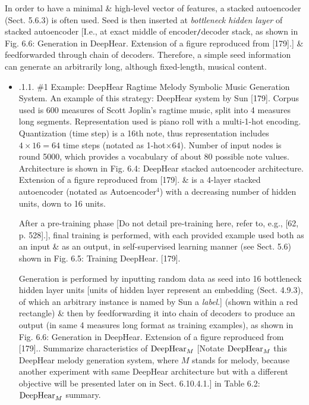 \documentclass{article}
\begin{document}
\begin{itemize}
\begin{itemize}
\begin{itemize}
			In order to have a minimal \& high-level vector of features, a stacked autoencoder (Sect. 5.6.3) is often used. Seed is then inserted at {\it bottleneck hidden layer} of stacked autoencoder [I.e., at exact middle of encoder{\tt/}decoder stack, as shown in {\sf Fig. 6.6: Generation in DeepHear. Extension of a figure reproduced from [179].}] \& feedforwarded through chain of decoders. Therefore, a simple seed information can generate an arbitrarily long, although fixed-length, musical content.
			\begin{itemize}
				\item {.1.1. \#1 Example: DeepHear Ragtime Melody Symbolic Music Generation System.} An example of this strategy: DeepHear system by {\sc Sun} [179]. Corpus used is 600 measures of {\sc Scott Joplin}'s ragtime music, split into 4 measures long segments. Representation used is piano roll with a multi-1-hot encoding. Quantization (time step) is a 16th note, thus representation includes $4\times16 = 64$ time steps (notated as 1-hot$\times64$). Number of input nodes is round 5000, which provides a vocabulary of about 80 possible note values. Architecture is shown in {\sf Fig. 6.4: DeepHear stacked autoencoder architecture. Extension of a figure reproduced from [179].} \& is a 4-layer stacked autoencoder (notated as Autoencoder${}^4$) with a decreasing number of hidden units, down to 16 units.
				
				After a pre-training phase [Do not detail pre-training here, refer to, e.g., [62, p. 528].], final training is performed, with each provided example used both as an input \& as an output, in self-supervised learning manner (see Sect. 5.6) shown in {\sf Fig. 6.5: Training DeepHear. [179]}.
				
				Generation is performed by inputting random data as seed into 16 bottleneck hidden layer units [units of hidden layer represent an embedding (Sect. 4.9.3), of which an arbitrary instance is named by {\sc Sun} a {\it label}.] (shown within a red rectangle) \& then by feedforwarding it into chain of decoders to produce an output (in same 4 measures long format as training examples), as shown in {\sf Fig. 6.6: Generation in DeepHear. Extension of a figure reproduced from [179].}. Summarize characteristics of ${\rm DeepHear}_M$ [Notate ${\rm DeepHear}_M$ this DeepHear melody generation system, where $M$ stands for melody, because another experiment with same DeepHear architecture but with a different objective will be presented later on in Sect. 6.10.4.1.] in {\sf Table 6.2: ${\rm DeepHear}_M$ summary.}
				

\end{itemize}
\end{itemize}
\end{itemize}
\end{itemize}
\end{document}
